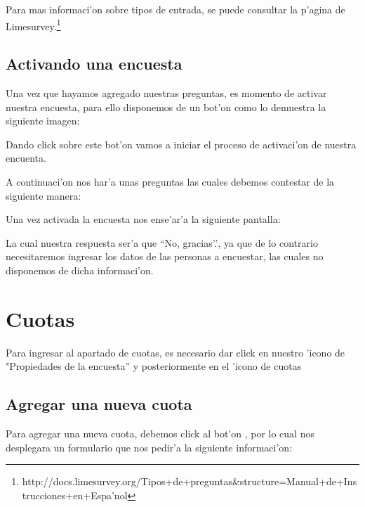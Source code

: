\documentclass[12pt,spanish]{report}
\begin{document}
Para mas informaci'on sobre tipos de entrada, se puede consultar la p'agina de Limesurvey.\footnote{http://docs.limesurvey.org/Tipos+de+preguntas\&structure=Manual+de+Instrucciones+en+Espa'nol}
\newpage

\subsection {Activando una encuesta}

Una vez que hayamos agregado nuestras preguntas, es momento de activar nuestra encuesta, para ello disponemos de un bot'on como lo demuestra la siguiente imagen:
\par
\centerline{\hbox{}}
\par 

Dando click sobre este bot'on vamos a iniciar el proceso de activaci'on de nuestra encuenta.

A continuaci'on nos har'a unas preguntas las cuales debemos contestar de la siguiente manera:
\par
\centerline{\hbox{}}
\par 


Una vez activada la encuesta nos ense'ar'a la siguiente pantalla:
\par
\centerline{\hbox{}}
\par 

La cual nuestra respuesta ser'a que ``No, gracias'.', ya que de lo contrario necesitaremos ingresar los datos de las personas a encuestar, las cuales no disponemos de dicha informaci'on.

\section {Cuotas}
Para ingresar al apartado de cuotas, es necesario dar click en nuestro 'icono de "Propiedades de la encuesta'' y posteriormente en el 'icono de cuotas 

\subsection{Agregar una nueva cuota}
Para agregar una nueva cuota, debemos click al bot'on , por lo cual nos desplegara un formulario que nos pedir'a la siguiente informaci'on:
\par
\centerline{\hbox{}}
\par 


\end{document}
